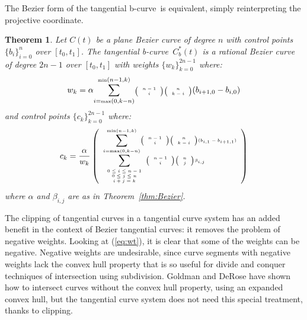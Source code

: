 \documentclass[12pt]{article}
\newcommand{\tinychoice}[2]{\mbox{\tiny{$\left( \begin{array}{c} #1 \\ #2 \end{array} \right)$}}}
\newtheorem{theorem}{Theorem}[section]
\newcommand{\btang}{tangential b-curve\ }
\begin{document}
\noindent The Bezier form of the \btang is equivalent, 
simply reinterpreting the projective coordinate.
%
\begin{theorem}
\label{thm:rationaldualb}
Let $C(t)$ be a plane Bezier curve of degree $n$ 
with control points $\{ b_i \}_{i=0}^n$ over $[t_0,t_1]$.
The \btang $C_b^*(t)$ is a rational Bezier curve of degree $2n-1$ 
over $[t_0,t_1]$ with weights $\{w_k\}_{k=0}^{2n-1}$ where: 
\begin{displaymath}
\scriptsize{
w_k = \alpha
\displaystyle{\sum_{i=\mbox{\tiny{max}}(0,k-n)}^{\mbox{\tiny{min}}(n-1,k)}}
	\tinychoice{n-1}{i} \tinychoice{n}{k-i} (b_{i+1,0} - b_{i,0})
}
\end{displaymath}
%
and control points $\{c_k\}_{k=0}^{2n-1}$ where:
\begin{displaymath}
\tiny{
c_k = \frac{\alpha}{w_k} 
\left(
\begin{array}{l}
	\displaystyle{\sum_{i=\mbox{\tiny{max}}(0,k-n)}^{\mbox{\tiny{min}}(n-1,k)}}
	\tinychoice{n-1}{i} \tinychoice{n}{k-i} (b_{i,1} - b_{i+1,1})\\
%
	\displaystyle{\sum_{\begin{array}{c} \mbox{\tiny{$0 \leq i \leq n-1$}} \\ 
		       \mbox{\tiny{$0 \leq j \leq n$}} \\ 
		       \mbox{\tiny{$i+j=k$}} \end{array}}}
	\tinychoice{n-1}{i} \tinychoice{n}{j} \beta_{i,j}
\end{array}
\right)
}
\end{displaymath}
where $\alpha$ and $\beta_{i,j}$ are as in Theorem~\ref{thm:Bezier}.
\end{theorem}


The clipping of tangential curves in a tangential curve system
has an added benefit in the context of Bezier tangential curves: 
it removes the problem of negative weights.
Looking at (\ref{eq:wt}),
it is clear that some of the weights can be negative.
Negative weights are undesirable, 
since curve segments with negative weights
lack the convex hull property that is so useful for divide and conquer
techniques of intersection using subdivision.
Goldman and DeRose \cite{goldman86} have shown how to intersect curves without
the convex hull property, using an expanded convex hull,
but the tangential curve system does not need this special treatment,
thanks to clipping.
\end{document}
